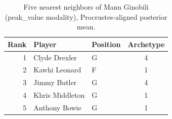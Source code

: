 \begin{table}[htbp]
  \centering\small
  \begin{tabular}{rllc}
    \toprule
    Rank & Player & Position & Archetype \\
    \midrule
    1 & Clyde Drexler & G & 4 \\
    2 & Kawhi Leonard & F & 1 \\
    3 & Jimmy Butler & G & 4 \\
    4 & Khris Middleton & G & 1 \\
    5 & Anthony Bowie & G & 1 \\
    \bottomrule
  \end{tabular}
  \caption{Five nearest neighbors of Manu Ginobili (peak_value modality), Procrustes-aligned posterior mean.}
  \label{tab:Manu_Ginobili_neighbors_peak_value}
\end{table}

